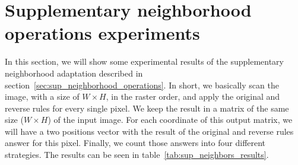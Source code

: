 \section{Supplementary neighborhood operations experiments}
\label{sec:sno_experiments}
In this section, we will show some experimental results of the supplementary neighborhood adaptation described in section~\ref{sec:sup_neighborhood_operations}. In short, we basically scan the image, with a size of $W \times H$, in the raster order, and apply the original and reverse rules for every single pixel. We keep the result in a matrix of the same size ($W \times H$) of the input image. For each coordinate of this output matrix, we will have a two positions vector with the result of the original and reverse rules answer for this pixel. Finally, we count those answers into four different strategies. The results can be seen in table~\ref{tab:sup_neighbors_results}.


